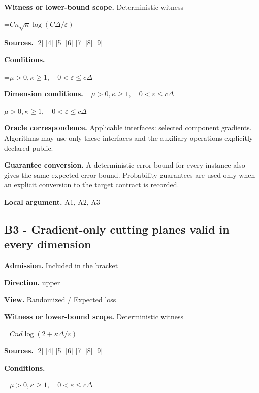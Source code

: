 \documentclass[10pt,a4paper]{article}
\newcommand{\AtlasMath}[1]{\par\begingroup\centering\setbox0=\hbox{$\displaystyle #1$}\ifdim\wd0>1.4\linewidth\typeout{ATLAS WIDE FORMULA: \the\wd0}\fi\ifdim\wd0>\linewidth\resizebox{\linewidth}{!}{\box0}\else\box0\fi\par\endgroup}
\newcommand{\AtlasInlineMath}[1]{\begingroup\setbox0=\hbox{$#1$}\ifdim\wd0>.4\linewidth\endgroup\AtlasMath{#1}\else\endgroup$#1$\fi}
\begin{document}
\textbf{Witness or lower-bound scope.} Deterministic witness

\AtlasMath{Cn\sqrt\kappa\log(C\Delta/\varepsilon)}
\textbf{Sources.} \href{https://proceedings.mlr.press/v97/zhou19b/zhou19b.pdf}{[2]} \href{https://arxiv.org/pdf/1405.4980}{[4]} \href{https://arxiv.org/pdf/2101.09740v2}{[5]} \href{https://arxiv.org/pdf/2609.33360v2}{[6]} \href{https://arxiv.org/pdf/2609.10874}{[7]} \href{https://www2.isye.gatech.edu/~nemirovs/MOR_AccuracyCertificates.pdf}{[8]} \href{https://arxiv.org/pdf/2609.20701}{[9]}

\textbf{Conditions.} 
\AtlasMath{\mu>0,\kappa\ge1,\quad0<\varepsilon\le c\Delta}


\textbf{Dimension conditions.} \AtlasInlineMath{\mu>0,\kappa\ge1,\quad0<\varepsilon\le c\Delta}

\textbf{Oracle correspondence.} Applicable interfaces: selected component gradients. Algorithms may use only these interfaces and the auxiliary operations explicitly declared public.

\textbf{Guarantee conversion.} A deterministic error bound for every instance also gives the same expected-error bound. Probability guarantees are used only when an explicit conversion to the target contract is recorded.

\textbf{Local argument.} A1, A2, A3

\subsection{B3 - Gradient-only cutting planes valid in every dimension}
\textbf{Admission.} Included in the bracket

\textbf{Direction.} upper

\textbf{View.} Randomized / Expected loss

\textbf{Witness or lower-bound scope.} Deterministic witness

\AtlasMath{Cnd\log(2+\kappa\Delta/\varepsilon)}
\textbf{Sources.} \href{https://proceedings.mlr.press/v97/zhou19b/zhou19b.pdf}{[2]} \href{https://arxiv.org/pdf/1405.4980}{[4]} \href{https://arxiv.org/pdf/2101.09740v2}{[5]} \href{https://arxiv.org/pdf/2609.33360v2}{[6]} \href{https://arxiv.org/pdf/2609.10874}{[7]} \href{https://www2.isye.gatech.edu/~nemirovs/MOR_AccuracyCertificates.pdf}{[8]} \href{https://arxiv.org/pdf/2609.20701}{[9]}

\textbf{Conditions.} 
\AtlasMath{\mu>0,\kappa\ge1,\quad0<\varepsilon\le c\Delta}
\end{document}
